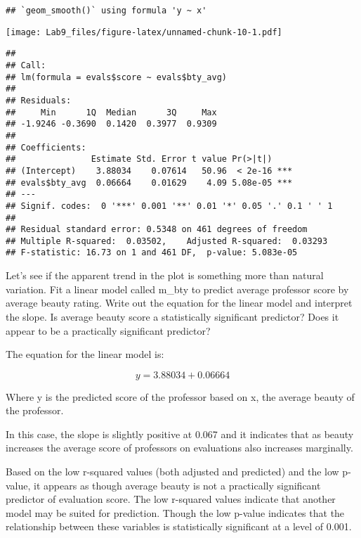 \documentclass[
]{article}
\newenvironment{Shaded}{\begin{snugshade}}{\end{snugshade}}
\newcommand{\KeywordTok}[1]{\textcolor[rgb]{0.13,0.29,0.53}{\textbf{#1}}}
\newcommand{\NormalTok}[1]{#1}
\newcommand{\OperatorTok}[1]{\textcolor[rgb]{0.81,0.36,0.00}{\textbf{#1}}}
\newcommand{\StringTok}[1]{\textcolor[rgb]{0.31,0.60,0.02}{#1}}
\begin{document}
\begin{verbatim}
## `geom_smooth()` using formula 'y ~ x'
\end{verbatim}

\texttt{[image: Lab9\_files/figure-latex/unnamed-chunk-10-1.pdf]}

\begin{Shaded}
\end{Shaded}

\begin{verbatim}
## 
## Call:
## lm(formula = evals$score ~ evals$bty_avg)
## 
## Residuals:
##     Min      1Q  Median      3Q     Max 
## -1.9246 -0.3690  0.1420  0.3977  0.9309 
## 
## Coefficients:
##               Estimate Std. Error t value Pr(>|t|)    
## (Intercept)    3.88034    0.07614   50.96  < 2e-16 ***
## evals$bty_avg  0.06664    0.01629    4.09 5.08e-05 ***
## ---
## Signif. codes:  0 '***' 0.001 '**' 0.01 '*' 0.05 '.' 0.1 ' ' 1
## 
## Residual standard error: 0.5348 on 461 degrees of freedom
## Multiple R-squared:  0.03502,    Adjusted R-squared:  0.03293 
## F-statistic: 16.73 on 1 and 461 DF,  p-value: 5.083e-05
\end{verbatim}

Let's see if the apparent trend in the plot is something more than
natural variation. Fit a linear model called m\_bty to predict average
professor score by average beauty rating. Write out the equation for the
linear model and interpret the slope. Is average beauty score a
statistically significant predictor? Does it appear to be a practically
significant predictor?

The equation for the linear model is:

\[y = 3.88034 + 0.06664\]

Where y is the predicted score of the professor based on x, the average
beauty of the professor.

In this case, the slope is slightly positive at 0.067 and it indicates
that as beauty increases the average score of professors on evaluations
also increases marginally.

Based on the low r-squared values (both adjusted and predicted) and the
low p-value, it appears as though average beauty is not a practically
significant predictor of evaluation score. The low r-squared values
indicate that another model may be suited for prediction. Though the low
p-value indicates that the relationship between these variables is
statistically significant at a level of 0.001.
\end{document}
